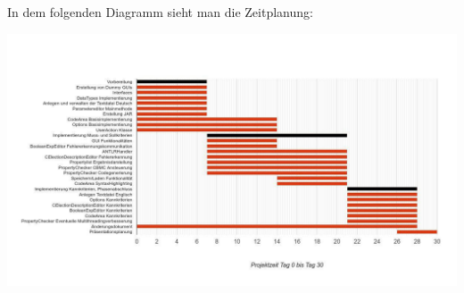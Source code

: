 \documentclass[a4paper]{scrreprt}
\begin{document}
\vspace{8mm}
In dem folgenden Diagramm sieht man die Zeitplanung: \\
\begin{landscape}
\includegraphics[width=1.4\textwidth] {planung.jpg}
\end{landscape}
\end{document}
